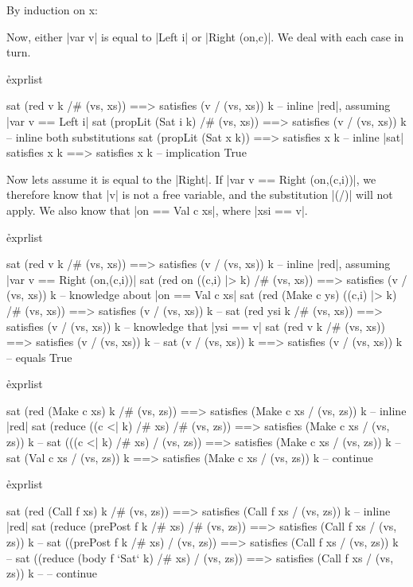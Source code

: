 By induction on x:


Now, either |var v| is equal to |Left i| or |Right (on,c)|. We deal with each case in turn.

\h{exprlist}\begin{code}
sat (red v k /# (vs, xs)) ==> satisfies (v / (vs, xs)) k
    -- inline |red|, assuming |var v == Left i|
sat (propLit (Sat i k) /# (vs, xs)) ==> satisfies (v / (vs, xs)) k
    -- inline both substitutions
sat (propLit (Sat x k)) ==> satisfies x k
    -- inline |sat|
satisfies x k ==> satisfies x k
    -- implication
True
\end{code}

Now lets assume it is equal to the |Right|. If |var v == Right (on,(c,i))|, we therefore know that |v| is not a free variable, and the substitution |(/)| will not apply. We also know that |on == Val c xs|, where |xsi == v|.

\h{exprlist}\begin{code}
sat (red v k /# (vs, xs)) ==> satisfies (v / (vs, xs)) k
    -- inline |red|, assuming |var v == Right (on,(c,i))|
sat (red on ((c,i) |> k) /# (vs, xs)) ==> satisfies (v / (vs, xs)) k
    -- knowledge about |on == Val c xs|
sat (red (Make c ys) ((c,i) |> k) /# (vs, xs)) ==> satisfies (v / (vs, xs)) k
    -- \lemma{| ||> |}
sat (red ysi k /# (vs, xs)) ==> satisfies (v / (vs, xs)) k
    -- knowledge that |ysi == v|
sat (red v k /# (vs, xs)) ==> satisfies (v / (vs, xs)) k
    -- 
sat (v / (vs, xs)) k ==> satisfies (v / (vs, xs)) k
    -- equals
True
\end{code}


\h{exprlist}\begin{code}
sat (red (Make c xs) k /# (vs, zs)) ==> satisfies (Make c xs / (vs, zs)) k
    -- inline |red|
sat (reduce ((c <| k) /# xs) /# (vs, zs)) ==> satisfies (Make c xs / (vs, zs)) k
    -- 
sat (((c <| k) /# xs) / (vs, zs)) ==> satisfies (Make c xs / (vs, zs)) k
    -- 
sat (Val c xs / (vs, zs)) k ==> satisfies (Make c xs / (vs, zs)) k
    -- continue
\end{code}


\h{exprlist}\begin{code}
sat (red (Call f xs) k /# (vs, zs)) ==> satisfies (Call f xs / (vs, zs)) k
    -- inline |red|
sat (reduce (prePost f k /# xs) /# (vs, zs)) ==> satisfies (Call f xs / (vs, zs)) k
    -- 
sat ((prePost f k /# xs) / (vs, zs)) ==> satisfies (Call f xs / (vs, zs)) k
    -- 
sat ((reduce (body f `Sat` k) /# xs) / (vs, zs)) ==> satisfies (Call f xs / (vs, zs)) k
    -- 
    -- continue
\end{code}

